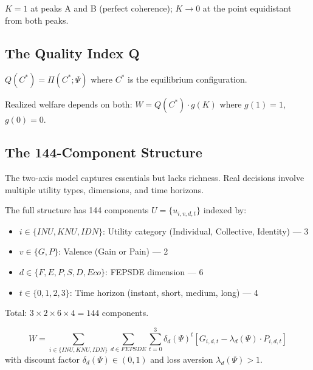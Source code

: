 $K = 1$ at peaks A and B (perfect coherence); $K \to 0$ at the point equidistant from both peaks.

\subsection{The Quality Index Q}

\begin{definition}
$Q(C^*) = \Pi(C^*; \Psi)$ where $C^*$ is the equilibrium configuration.
\end{definition}

Realized welfare depends on both: $W = Q(C^*) \cdot g(K)$ where $g(1) = 1$, $g(0) = 0$.

\subsection{The 144-Component Structure}

The two-axis model captures essentials but lacks richness.
Real decisions involve multiple utility types, dimensions, and time horizons.

\begin{definition}
The full structure has 144 components $U = \{u_{i,v,d,t}\}$ indexed by:
\begin{itemize}
  \item $i \in \{INU, KNU, IDN\}$: Utility category (Individual, Collective, Identity) --- 3
  \item $v \in \{G, P\}$: Valence (Gain or Pain) --- 2
  \item $d \in \{F, E, P, S, D, Eco\}$: FEPSDE dimension --- 6
  \item $t \in \{0, 1, 2, 3\}$: Time horizon (instant, short, medium, long) --- 4
\end{itemize}
Total: $3 \times 2 \times 6 \times 4 = 144$ components.
\end{definition}

\begin{definition}
\begin{equation}
  W = \sum_{i \in \{INU, KNU, IDN\}} \sum_{d \in FEPSDE} \sum_{t=0}^{3} 
      \delta_d(\Psi)^t \left[ G_{i,d,t} - \lambda_d(\Psi) \cdot P_{i,d,t} \right]
  \label{eq:fullwelfare}
\end{equation}
with discount factor $\delta_d(\Psi) \in (0, 1)$ and loss aversion $\lambda_d(\Psi) > 1$.
\end{definition}

